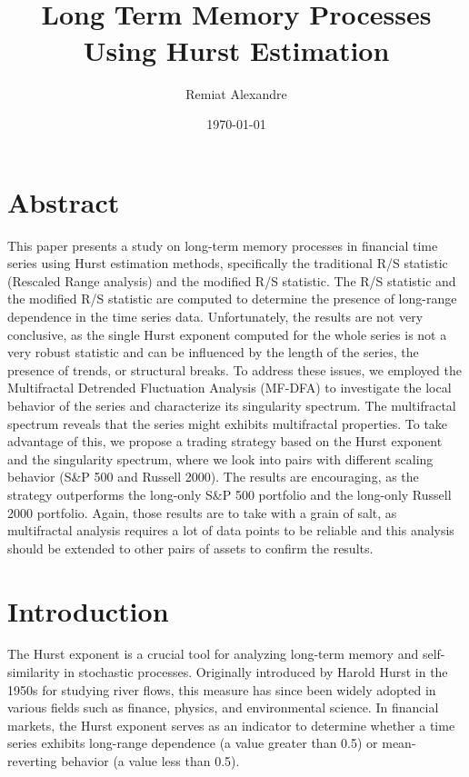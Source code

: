 \documentclass[11pt]{extarticle}
\title{
    \hspace*{-12cm}
    \vspace*{1cm}
    \protect\\
    \vspace*{1cm}
    \textbf{Long Term Memory Processes Using Hurst Estimation}
}
\author{Remiat Alexandre}
\date{\today}
\begin{document}

\maketitle


\newpage


\section*{Abstract}

This paper presents a study on long-term memory processes in financial time series using Hurst estimation methods,
specifically the traditional R/S statistic (Rescaled Range analysis) and the modified R/S statistic.
The R/S statistic and the modified R/S statistic are computed to determine the presence of long-range dependence in the time series data.
Unfortunately, the results are not very conclusive, as the single Hurst exponent computed for the whole series is not a very robust statistic and can be
influenced by the length of the series, the presence of trends, or structural breaks.
To address these issues, we employed the Multifractal Detrended Fluctuation Analysis (MF-DFA) to investigate the
local behavior of the series and characterize its singularity spectrum. The multifractal spectrum reveals that the series
might exhibits multifractal properties. To take advantage of this, we propose a trading strategy based on the Hurst
exponent and the singularity spectrum, where we look into pairs with different scaling behavior (S\&P 500 and Russell 2000).
The results are encouraging, as the strategy outperforms the long-only S\&P 500 portfolio and the long-only Russell 2000 portfolio.
Again, those results are to take with a grain of salt, as multifractal analysis requires a lot of data points to be
reliable and this analysis should be extended to other pairs of assets to confirm the results.


\newpage

\section{Introduction}

The Hurst exponent is a crucial tool for analyzing long-term memory and self-similarity in stochastic processes. Originally introduced by Harold Hurst in the 1950s for studying river flows, this measure has since been widely adopted in various fields such as finance, physics, and environmental science. In financial markets, the Hurst exponent serves as an indicator to determine whether a time series exhibits long-range dependence (a value greater than 0.5) or mean-reverting behavior (a value less than 0.5).
\end{document}
